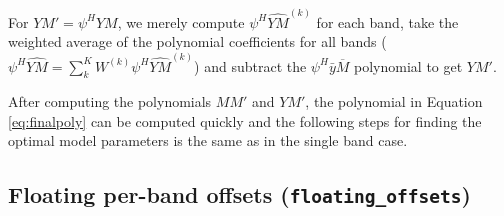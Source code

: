 \documentclass[apj]{emulateapj}
\newcommand{\YMhat}{\widehat{YM}}
\newcommand{\Mbar}{\overline{M}}
\newcommand{\Wtk}[1][k]{W^{(#1)}}
\newcommand{\eith}{\psi}
\begin{document}
\begin{appendix}
For $YM' = \eith^H YM$, we merely compute $\eith^H\YMhat^{(k)}$ for each band, take the weighted average of the polynomial coefficients for all bands ($\eith^H\YMhat = \sum_k^K \Wtk \eith^H\YMhat^{(k)}$) and subtract the $\eith^H\bar{y}\Mbar$ polynomial to get $YM'$.

After computing the polynomials $MM'$ and $YM'$, the polynomial in Equation \ref{eq:finalpoly} can be computed quickly and the following steps for finding the optimal model parameters is the same as in the single band case.

\subsection{Floating per-band offsets (\texttt{floating\_offsets})}
\label{app:floatingoffsets}


\end{appendix}
\end{document}
